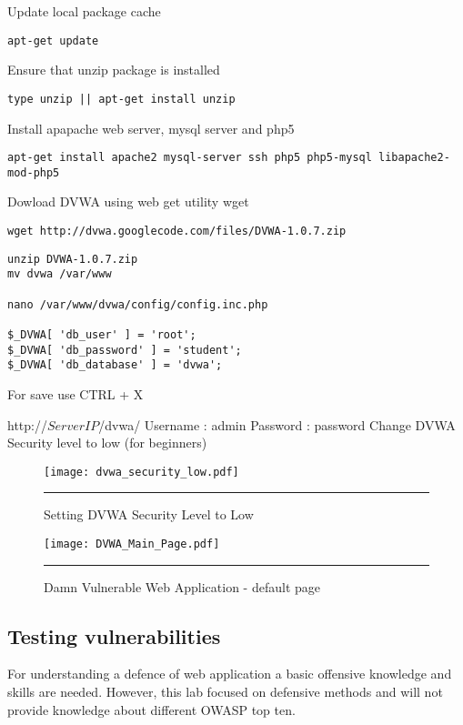Update local package cache
\begin{verbatim}
apt-get update
\end{verbatim}


Ensure that unzip package is installed
\begin{verbatim}
type unzip || apt-get install unzip
\end{verbatim}

Install apapache web server, mysql server and php5
\begin{verbatim}
apt-get install apache2 mysql-server ssh php5 php5-mysql libapache2-mod-php5
\end{verbatim}


Dowload DVWA using web get utility wget
\begin{verbatim}
wget http://dvwa.googlecode.com/files/DVWA-1.0.7.zip
\end{verbatim}

\begin{verbatim}
unzip DVWA-1.0.7.zip
mv dvwa /var/www

nano /var/www/dvwa/config/config.inc.php

$_DVWA[ 'db_user' ] = 'root';
$_DVWA[ 'db_password' ] = 'student';
$_DVWA[ 'db_database' ] = 'dvwa';
\end{verbatim}
For save use  CTRL + X


http://$ServerIP$/dvwa/
Username : admin
Password : password
Change DVWA Security level to low (for beginners)

\begin{figure}[H] 
 \centering 
 \texttt{[image: dvwa\_security\_low.pdf]}
 \rule{25em}{0.5pt}  
 \caption{Setting DVWA Security Level to Low} 
 \label{Setting DVWA Security Level to Low} 
\end{figure}


\begin{figure}[H] 
 \centering 
 \texttt{[image: DVWA\_Main\_Page.pdf]}
 \rule{30em}{0.5pt}  
 \caption{Damn Vulnerable Web Application - default page} 
 \label{Damn Vulnerable Web Application - default page} 
\end{figure}

\subsection{Testing vulnerabilities}
For understanding a defence of web application a basic offensive knowledge and skills are needed. However, this lab focused on defensive methods and will not provide knowledge about different \gls{OWASP} top ten. 

